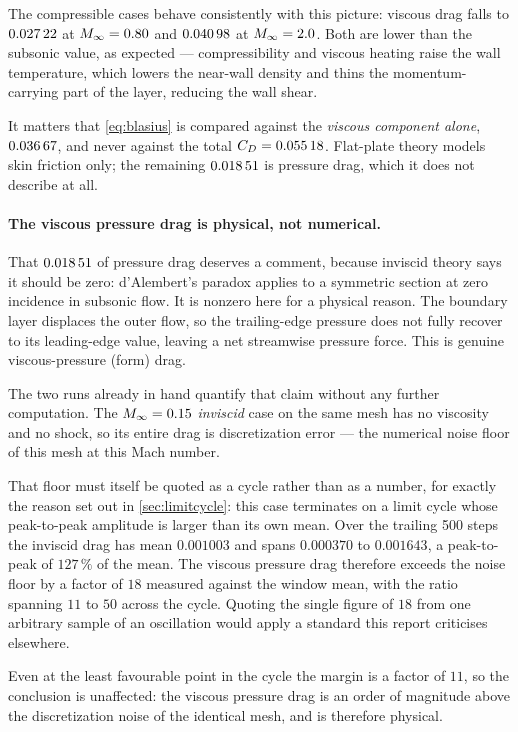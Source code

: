 The compressible cases behave consistently with this picture: viscous drag falls
to $\num{0.02722}$ at $M_\infty=0.80$ and $\num{0.04098}$ at $M_\infty=2.0$.
Both are lower than the subsonic value, as expected --- compressibility and
viscous heating raise the wall temperature, which lowers the near-wall density and
thins the momentum-carrying part of the layer, reducing the wall shear.

It matters that \cref{eq:blasius} is compared against the \emph{viscous component
alone}, $\num{0.03667}$, and never against the total
$C_D=\num{0.05518}$. Flat-plate theory models skin friction only; the
remaining $\num{0.01851}$ is pressure drag, which it does not describe at all.

\paragraph{The viscous pressure drag is physical, not numerical.} That
$\num{0.01851}$ of pressure drag deserves a comment, because inviscid theory
says it should be zero: d'Alembert's paradox applies to a symmetric section at
zero incidence in subsonic flow. It is nonzero here for a physical reason. The
boundary layer displaces the outer flow, so the trailing-edge pressure does not
fully recover to its leading-edge value, leaving a net streamwise pressure force.
This is genuine viscous-pressure (form) drag.

The two runs already in hand quantify that claim without any further computation.
The $M_\infty=0.15$ \emph{inviscid} case on the same mesh has no viscosity and no
shock, so its entire drag is discretization error --- the numerical noise floor of
this mesh at this Mach number.

That floor must itself be quoted as a cycle rather than as a number, for exactly the
reason set out in \cref{sec:limitcycle}: this case terminates on a limit cycle whose
peak-to-peak amplitude is larger than its own mean. Over the trailing 500 steps the
inviscid drag has mean $\num{0.001003}$ and spans $\num{0.000370}$ to
$\num{0.001643}$, a peak-to-peak of $127\,\%$ of the mean. The viscous pressure drag
therefore exceeds the noise floor by a factor of $18$ measured against the window
mean, with the ratio spanning $11$ to $50$ across the cycle. Quoting the single
figure of $18$ from one arbitrary sample of an oscillation would apply a standard
this report criticises elsewhere.

Even at the least favourable point in the cycle the margin is a factor of $11$, so
the conclusion is unaffected: the viscous pressure drag is an order of magnitude
above the discretization noise of the identical mesh, and is therefore physical.


